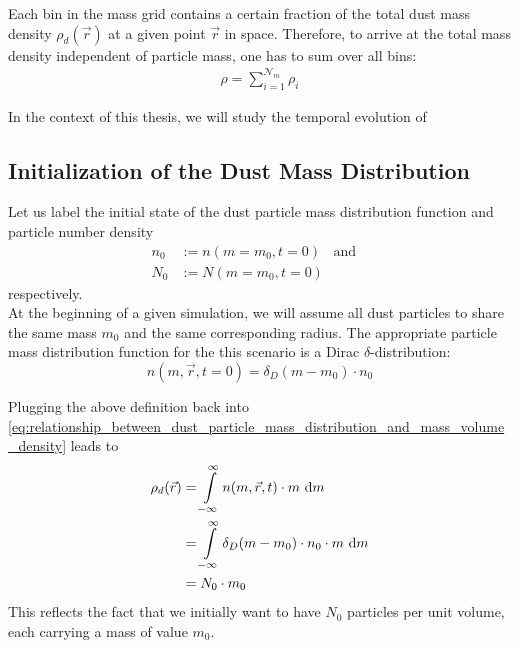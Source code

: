     Each bin in the mass grid contains a certain fraction of the total dust mass density
    $\rho_d(\vec r)$ at a given point $\vec r$ in space. 
    Therefore, to arrive at the total mass density independent of particle mass, 
    one has to sum over all bins:
    \begin{align}
      \rho=\sum_{i=1}^{\mathcal N_m} \rho_i
    \end{align}

    In the context of this thesis, we will study the temporal evolution of 

\clearpage\subsection{Initialization of the Dust Mass Distribution}

    Let us label the initial state of the dust particle mass distribution function and particle
    number density
    \begin{align}
        n_0 &:= n(m=m_0, t=0) 
        \ \ \ \ \text{and}\ \ \ \
        \\
        N_0 &:= N(m=m_0, t=0)
    \end{align}
    respectively. \\

    At the beginning of a given simulation, we will assume all dust particles to share the same 
    mass $m_0$ and the same corresponding radius.
    The appropriate particle mass distribution function for the this scenario is a 
    Dirac $\delta$-distribution:
    \begin{equation}
        \label{eq:dirac_delta_identity}
        n(m, \vec r, t=0) = \delta_D(m-m_0) \cdot n_0  
    \end{equation}

    Plugging the above definition back into
    \cref{eq:relationship_between_dust_particle_mass_distribution_and_mass_volume_density}
    leads to
    \begin{align}
        \rho_d(\vec r) 
            &= \int\limits_{-\infty}^\infty n(m, \vec r, t) \cdot m\ \text dm \\
            &= \int\limits_{-\infty}^\infty \delta_D(m-m_0) \cdot n_0 \cdot m\ \text dm \\
            &= N_0 \cdot m_0
    \end{align}
    This reflects the fact that we initially want to have $N_0$ particles per unit volume, each 
    carrying a mass of value $m_0$. \\

